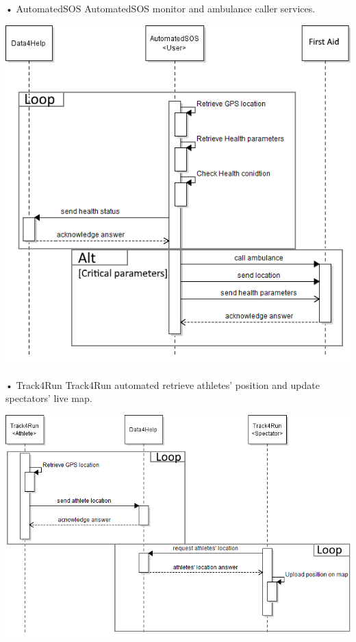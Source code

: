 \begin{enumerate}
\begin{minipage}{\textwidth}
\FloatBarrier
\end{minipage}


\begin{minipage}{\textwidth}
\item[•]{\Large AutomatedSOS}
\FloatBarrier
AutomatedSOS monitor and ambulance caller services.
\begin{center}
\includegraphics[scale=0.77]{Images/Seq_AutoSOS_monitor.png}
\end{center}
\FloatBarrier

\item[•]{\Large Track4Run}
\FloatBarrier
Track4Run automated retrieve athletes' position and update spectators' live map.
\begin{center}
\includegraphics[scale=0.77]{Images/Seq_Track4Run_raceUp.png}
\end{center}
\FloatBarrier
\end{minipage}

\end{enumerate}


